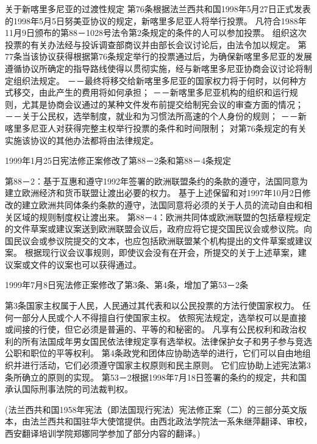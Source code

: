     关于新喀里多尼亚的过渡性规定
    第76条根据法兰西共和国1998年5月27日正式发表的1998年5月5日努美亚协议的规定，新喀里多尼亚人将举行投票。
    凡符合1988年11月9日颁布的第88－1028号法令第2条规定的条件的人可以参加投票。
    组织这次投票的有关办法经与投诉调查部商议并由部长会议讨论后，由法令加以规定。
    第77条当该协议获得根据第76条规定举行的投票通过后，为确保新喀里多尼亚的发展遵循协议所确定的指导路线使得以贯彻实施，经与新喀里多尼亚协商会议讨论将制定组织法规定。
    －－最终将移交给新喀里多尼亚的国家权力将于何时，以何种方式移交，由此产生的费用将如何承担；
    －－新喀里多尼亚机构的组织和运行规则，尤其是协商会议通过的某种文件发布前提交给制宪会议的审查方面的情况；
    －－关于公民权，选举制度，就业和为习惯法所高速的个人身份的规则；
    －－新喀里多尼亚人对获得完整主权举行投票的条件和时间限制；
    对第76条规定的有关实施该协议的其他办法都将由法律规定。
 
            1999年1月25日宪法修正案修改了第88－2条和第88－4条规定
 
    第88－2：基于互惠和遵守1992年签署的欧洲联盟条约的条款的遵守，法国同意为建立欧洲经济和货币联盟让渡出必要的权力。
    基于上述保留和对1997年10月2日修改的建立欧洲共同体条约条款的遵守，法国同意将必须的关于人员的流动自由和相关区域的规则制度权让渡出来。
    第88－4：欧洲共同体或欧洲联盟的包括章程规定的文件草案或建议案送到欧洲联盟会议后，政府应将它提交国民议会或参议院。向国民议会或参议院提交的文本，也应包括欧洲联盟某个机构提出的文件草案或建议案。
    根据现行议会议事规则，即使议会没有在开会，所提交的关于上述草案，建议案或文件的议案也可以获得通过。
 
            1999年7月8日宪法修正案修改了第3条、第4条，增加了第53－2条
 
    第3条国家主权属于人民，人民通过其代表和以公民投票的方法行使国家权力。
    任何一部分人民或个人不得擅自行使国家主权。 
    依照宪法规定，选举权可以是直接或间接的行使，但它必须是普遍的、平等的和秘密的。
    凡享有公民权利和政治权利的所有法国成年男女国民依法律规定享有选举权。法律保护女子和男子参与竞选公职和职位的平等权利。
    第4条政党和团体应协助选举的进行，它们可以自由地组织并进行活动，它们必须遵守国家主权原则和民主原则。
    它们应协助上述宪法第3条所确立的原则的实现。
    第53－2根据1998年7月18日签署的条约的规定，共和国承认国际刑事法院的司法裁判权。 
 
(法兰西共和国1958年宪法（即法国现行宪法）宪法修正案（二）的三部分英文版本，由法兰西共和国驻华大使馆提供。由西北政法学院法一系朱继萍翻译、审校，西安翻译培训学院郑娜同学参加了部分内容的翻译。)